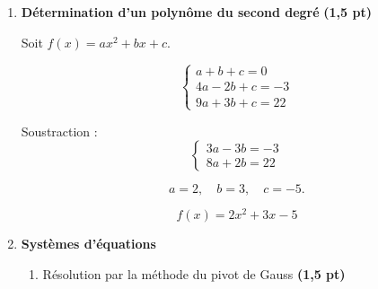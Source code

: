 \documentclass[12pt,a4paper]{article}
\begin{document}
\begin{enumerate}
\begin{enumerate}
Donc :
\(
x-3 \ge 0 \Rightarrow x \ge 3.
\)

On élève au carré :
\[
x-2 \le (x-3)^2=x^2-6x+9.
\]

\[
x^2-7x+11 \ge 0.
\]

\[
\Delta=49-44=5.
\]

\[
x \le \frac{7-\sqrt5}{2} \quad \text{ou} \quad x \ge \frac{7+\sqrt5}{2}.
\]

En tenant compte de $x\ge3$ :
\[
\boxed{x \ge \dfrac{7+\sqrt5}{2}}
\]

\item $\sqrt{x^2-x+1} \ge 2-x$

On remarque que :
\[
x^2-x+1>0 \quad \text{pour tout } x\in\mathbb{R}.
\]

\begin{itemize}
\item Si $2-x \le 0$ (i.e. $x\ge2$), l’inégalité est toujours vraie.
\item Si $x<2$, on élève au carré :
\[
x^2-x+1 \ge (2-x)^2=x^2-4x+4.
\]
\[
3x \ge 3 \Rightarrow x \ge 1.
\]
\end{itemize}

\[
\boxed{D=[1,+\infty[}
\]

\end{enumerate}

\item \textbf{Détermination d’un polynôme du second degré} \hfill \textbf{(1,5 pt)}

Soit $f(x)=ax^2+bx+c$.

\[
\begin{cases}
a+b+c=0 \\
4a-2b+c=-3 \\
9a+3b+c=22
\end{cases}
\]

Soustraction :
\[
\begin{cases}
3a-3b=-3 \\
8a+2b=22
\end{cases}
\]

\[
a=2,\quad b=3,\quad c=-5.
\]

\[
\boxed{f(x)=2x^2+3x-5}
\]

\item \textbf{Systèmes d’équations}

\begin{enumerate}

\item Résolution par la méthode du pivot de Gauss \hfill \textbf{(1,5 pt)}


\end{enumerate}
\end{enumerate}
\end{document}
